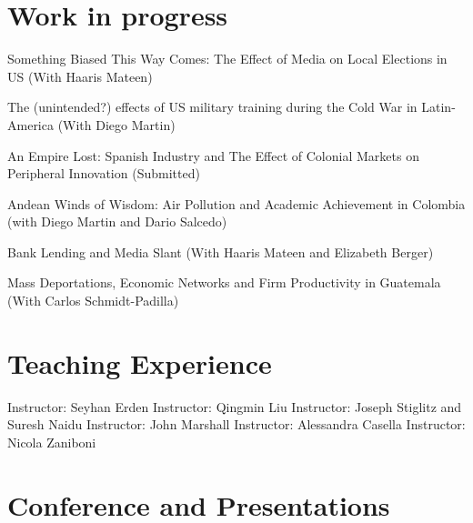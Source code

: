 \documentclass{moderncv}
\begin{document}
\section{\textbf{Work in progress}}

{Something Biased This Way Comes: The Effect of Media on Local Elections in US (With Haaris Mateen) \\ }

{The (unintended?) effects of US military training during the Cold War in Latin-America (With Diego Martin) \\ }

{An Empire Lost: Spanish Industry and The Effect of Colonial Markets on Peripheral  Innovation (Submitted)\\}

{Andean Winds of Wisdom: Air Pollution and Academic Achievement in Colombia (with Diego Martin and Dario Salcedo) \\ }

{Bank Lending and Media Slant (With Haaris Mateen and Elizabeth Berger) \\ }

{Mass Deportations, Economic Networks and Firm Productivity in Guatemala (With Carlos Schmidt-Padilla) \\ }

\section{\textbf{Teaching Experience}}
 {}{}{Instructor: Seyhan Erden}
 {}{}{Instructor: Qingmin Liu}
 {}{}{Instructor: Joseph Stiglitz and Suresh Naidu}
 {}{}{Instructor: John Marshall}
 {}{}{Instructor: Alessandra Casella}
 {}{}{Instructor: Nicola Zaniboni}

\section{\textbf{Conference and Presentations}}
\end{document}
